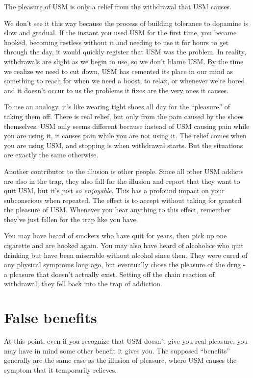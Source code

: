 \documentclass[
  openany]{book}
\begin{document}
The pleasure of USM is only a relief from the withdrawal that USM causes.

We don't see it this way because the process of building tolerance to dopamine is slow and gradual. If the instant you used USM for the first time, you became hooked, becoming restless without it and needing to use it for hours to get through the day, it would quickly register that USM was the problem. In reality, withdrawals are slight as we begin to use, so we don't blame USM. By the time we realize we need to cut down, USM has cemented its place in our mind as something to reach for when we need a boost, to relax, or whenever we're bored and it doesn't occur to us the problems it fixes are the very ones it causes.

To use an analogy, it's like wearing tight shoes all day for the ``pleasure'' of taking them off. There is real relief, but only from the pain caused by the shoes themselves. USM only seems different because instead of USM causing pain while you are using it, it causes pain while you are not using it. The relief comes when you are using USM, and stopping is when withdrawal starts. But the situations are exactly the same otherwise.

Another contributor to the illusion is other people. Since all other USM addicts are also in the trap, they also fall for the illusion and report that they want to quit USM, but it's just \emph{so enjoyable}. This has a profound impact on your subconscious when repeated. The effect is to accept without taking for granted the pleasure of USM. Whenever you hear anything to this effect, remember they've just fallen for the trap like you have.

You may have heard of smokers who have quit for years, then pick up one cigarette and are hooked again. You may also have heard of alcoholics who quit drinking but have been miserable without alcohol since then. They were cured of any physical symptoms long ago, but eventually chose the pleasure of the drug - a pleasure that doesn't actually exist. Setting off the chain reaction of withdrawal, they fell back into the trap of addiction.

\chapter{False benefits}\label{benefits}

At this point, even if you recognize that USM doesn't give you real pleasure, you may have in mind some other benefit it gives you. The supposed ``benefits'' generally are the same case as the illusion of pleasure, where USM causes the symptom that it temporarily relieves.
\end{document}
